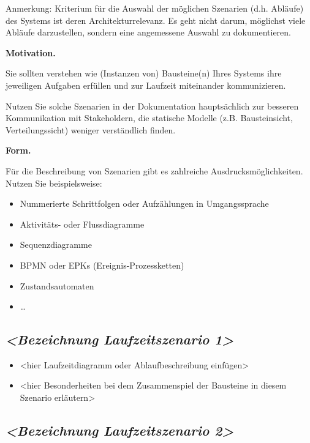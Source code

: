 \documentclass[]{article}
\begin{document}
Anmerkung: Kriterium für die Auswahl der möglichen Szenarien (d.h.
Abläufe) des Systems ist deren Architekturrelevanz. Es geht nicht darum,
möglichst viele Abläufe darzustellen, sondern eine angemessene Auswahl
zu dokumentieren.

\textbf{Motivation.}

Sie sollten verstehen wie (Instanzen von) Bausteine(n) Ihres Systems
ihre jeweiligen Aufgaben erfüllen und zur Laufzeit miteinander
kommunizieren.

Nutzen Sie solche Szenarien in der Dokumentation hauptsächlich zur
besseren Kommunikation mit Stakeholdern, die statische Modelle (z.B.
Bausteinsicht, Verteilungssicht) weniger verständlich finden.

\textbf{Form.}

Für die Beschreibung von Szenarien gibt es zahlreiche
Ausdrucksmöglichkeiten. Nutzen Sie beispielsweise:

\begin{itemize}
\item
  Nummerierte Schrittfolgen oder Aufzählungen in Umgangssprache
\item
  Aktivitäts- oder Flussdiagramme
\item
  Sequenzdiagramme
\item
  BPMN oder EPKs (Ereignis-Prozessketten)
\item
  Zustandsautomaten
\item
  \ldots{}
\end{itemize}

\subsection{\texorpdfstring{\emph{\textless{}Bezeichnung
Laufzeitszenario
1\textgreater{}}}{\textless{}Bezeichnung Laufzeitszenario 1\textgreater{}}}\label{__emphasis_bezeichnung_laufzeitszenario_1_emphasis}

\begin{itemize}
\item
  \textless{}hier Laufzeitdiagramm oder Ablaufbeschreibung
  einfügen\textgreater{}
\item
  \textless{}hier Besonderheiten bei dem Zusammenspiel der Bausteine in
  diesem Szenario erläutern\textgreater{}
\end{itemize}

\subsection{\texorpdfstring{\emph{\textless{}Bezeichnung
Laufzeitszenario
2\textgreater{}}}{\textless{}Bezeichnung Laufzeitszenario 2\textgreater{}}}\label{__emphasis_bezeichnung_laufzeitszenario_2_emphasis}
\end{document}
